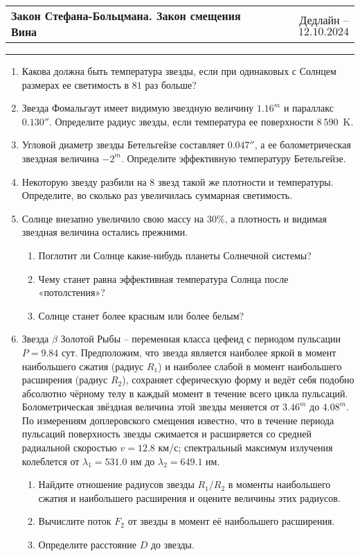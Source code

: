 \documentclass[12pt]{article}
\begin{document}
 \begin{tabularx}{\textwidth}{Xr}
  {\Large \textbf{Закон Стефана-Больцмана. Закон смещения Вина}} & Дедлайн -- $12.10.2024$ \\
 \end{tabularx}
 \noindent\rule{\textwidth}{0.4pt}
 \begin{enumerate}
        \item Какова должна быть температура звезды, если при одинаковых с Солнцем размерах ее светимость в $81$ раз больше?

        \item Звезда Фомальгаут имеет видимую звездную величину $1.16^m$ и параллакс $0.130''$. Определите радиус звезды, если температура ее поверхности $8~590$~K.
        
        \item Угловой диаметр звезды Бетельгейзе составляет $0.047''$, а ее болометрическая звездная величина $-2^m$. Определите эффективную температуру Бетельгейзе.

        \item Некоторую звезду разбили на $8$ звезд такой же плотности и температуры. Определите, во сколько раз увеличилась суммарная светимость.
        
        \item Солнце внезапно увеличило свою массу на $30\%$, а плотность и видимая звездная величина остались прежними.
        \begin{enumerate}
            \item Поглотит ли Солнце какие-нибудь планеты Солнечной системы?
            \item Чему станет равна эффективная температура Солнца после «потолстения»? 
            \item Солнце станет более красным или более белым?
        \end{enumerate}

        \item Звезда $\beta$ Золотой Рыбы -- переменная класса цефеид с периодом пульсации $P = 9.84$ сут. Предположим, что звезда является наиболее яркой в момент наибольшего сжатия (радиус $R_1$) и наиболее слабой в момент наибольшего расширения (радиус $R_2$), сохраняет сферическую форму и ведёт себя подобно абсолютно чёрному телу в каждый момент в течение всего цикла пульсаций. Болометрическая звёздная величина этой звезды меняется от $3.46^m$ до $4.08^m$. По измерениям доплеровского смещения известно, что в течение периода пульсаций поверхность звезды сжимается и расширяется со средней радиальной скоростью $v = 12.8$ км/с; спектральный максимум излучения колеблется от $\lambda_1 = 531.0$ нм до $\lambda_2 = 649.1$ нм.
        \begin{enumerate}
            \item Найдите отношение радиусов звезды $R_1/R_2$ в моменты наибольшего сжатия и наибольшего расширения и оцените величины этих радиусов.
            \item Вычислите поток $F_2$ от звезды в момент её наибольшего расширения.
            \item Определите расстояние $D$ до звезды.
        \end{enumerate}
        

\end{enumerate}
\end{document}
